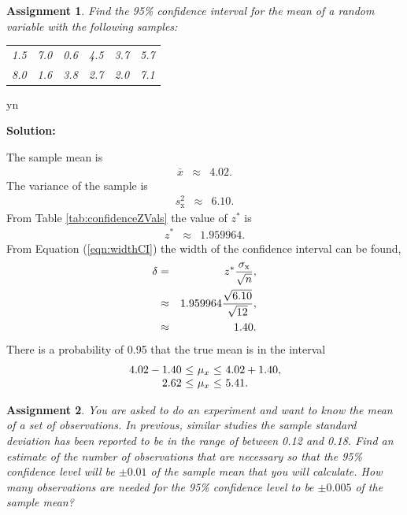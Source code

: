 \documentclass[12pt]{article}
\def\solutions{y}
\def\solutions{n}
\newtheorem{assignment}{Assignment}[section]
\begin{document}
\fi

\begin{assignment}
  Find the 95\% confidence interval for the mean of a random variable
  with the following samples:
  \begin{center}
    \begin{tabular}{rrrrrr}
       1.5 & 7.0 & 0.6 & 4.5 & 3.7 & 5.7 \\
       8.0 & 1.6 & 3.8 & 2.7 & 2.0 & 7.1
    \end{tabular}
  \end{center}
\end{assignment}

\if y\solutions

\textbf{Solution:}

The sample mean is
\begin{eqnarray*}
  \bar{x} & \approx & 4.02.
\end{eqnarray*}
The variance of the sample  is 
\begin{eqnarray*}
  s^2_{\mathrm x} & \approx & 6.10.
\end{eqnarray*}
From Table \ref{tab:confidenceZVals} the value of $z^*$ is
\begin{eqnarray*}
  z^* & \approx & 1.959964.
\end{eqnarray*}
From Equation (\ref{eqn:widthCI}) the width of the confidence interval
can be found,
\begin{eqnarray*}
  \delta & = & z^* \frac{\sigma_{\rm x}}{\sqrt{n}}, \\
  & \approx & 1.959964 \frac{\sqrt{6.10}}{\sqrt{12}}, \\
  & \approx & 1.40.
\end{eqnarray*}
There is a probability of 0.95 that the true mean is in the interval
\begin{eqnarray*}
  \begin{array}{r@{~\leq~}c@{~\leq~}l}
  4.02-1.40 & \mu_x & 4.02+1.40, \\
  2.62 & \mu_x & 5.41.
  \end{array}
\end{eqnarray*}

\fi



\begin{assignment}
  You are asked to do an experiment and want to know the mean of a set
  of observations. In previous, similar studies the sample standard
  deviation has been reported to be in the range of between 0.12 and
  0.18. Find an estimate of the number of observations that are
  necessary so that the 95\% confidence level will be $\pm 0.01$ of
  the sample mean that you will calculate. How many observations are
  needed for the 95\% confidence level to be $\pm 0.005$ of the sample
  mean?
\end{assignment}
\end{document}
